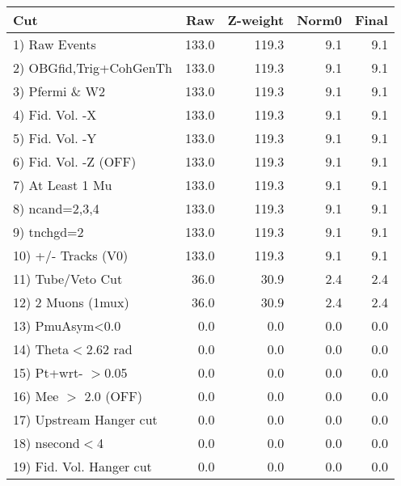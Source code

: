  \begin{table}[h!]\centering
 \begin{tabular}{||l||r|r|r|r||}
 \hline
 \hline
 Cut & Raw & Z-weight & Norm0 & Final \\
 \hline
  1) Raw Events           &       133.0 &       119.3 &         9.1 &         9.1 \\
  2) OBGfid,Trig+CohGenTh &       133.0 &       119.3 &         9.1 &         9.1 \\
  3) Pfermi \& W2         &       133.0 &       119.3 &         9.1 &         9.1 \\
  4) Fid. Vol. -X         &       133.0 &       119.3 &         9.1 &         9.1 \\
  5) Fid. Vol. -Y         &       133.0 &       119.3 &         9.1 &         9.1 \\
  6) Fid. Vol. -Z (OFF)   &       133.0 &       119.3 &         9.1 &         9.1 \\
  7) At Least 1 Mu        &       133.0 &       119.3 &         9.1 &         9.1 \\
  8) ncand=2,3,4          &       133.0 &       119.3 &         9.1 &         9.1 \\
  9) tnchgd=2             &       133.0 &       119.3 &         9.1 &         9.1 \\
 10) +/- Tracks (V0)      &       133.0 &       119.3 &         9.1 &         9.1 \\
 11) Tube/Veto Cut        &        36.0 &        30.9 &         2.4 &         2.4 \\
 12) 2 Muons (1mux)       &        36.0 &        30.9 &         2.4 &         2.4 \\
 13) PmuAsym<0.0          &         0.0 &         0.0 &         0.0 &         0.0 \\
 14) Theta$<$2.62 rad     &         0.0 &         0.0 &         0.0 &         0.0 \\
 15) Pt+wrt- $>$0.05      &         0.0 &         0.0 &         0.0 &         0.0 \\
 16) Mee $>$ 2.0  (OFF)   &         0.0 &         0.0 &         0.0 &         0.0 \\
 17) Upstream Hanger cut  &         0.0 &         0.0 &         0.0 &         0.0 \\
 18) nsecond$<$4          &         0.0 &         0.0 &         0.0 &         0.0 \\
 19) Fid. Vol. Hanger cut &         0.0 &         0.0 &         0.0 &         0.0 \\

\end{tabular}
\end{table}
